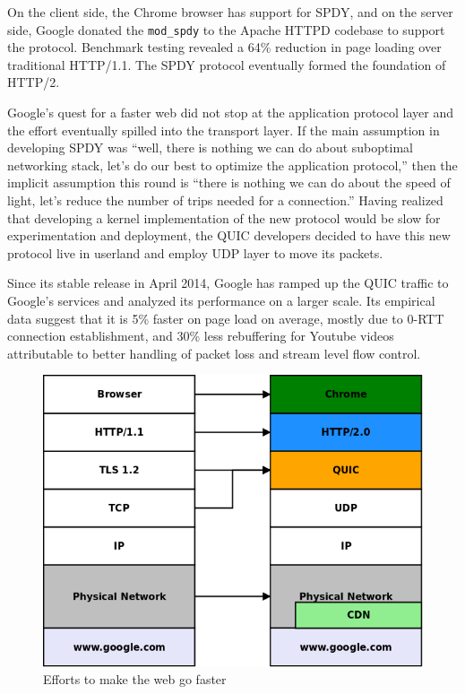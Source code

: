 \documentclass{sig-alternate-05-2015}
\begin{document}
On the client side, the Chrome browser has support for SPDY, and on the server side, Google donated the \texttt{mod\_spdy} to the Apache HTTPD codebase to support the protocol. Benchmark testing revealed a 64\% reduction in page loading over traditional HTTP/1.1. The SPDY protocol eventually formed the foundation of HTTP/2.

Google's quest for a faster web did not stop at the application protocol layer and the effort eventually spilled into the transport layer. If the main assumption in developing SPDY was ``well, there is nothing we can do about suboptimal networking stack, let's do our best to optimize the application protocol,'' then the implicit assumption this round is ``there is nothing we can do about the speed of light, let's reduce the number of trips needed for a connection.''\cite{quic:announcement} Having realized that developing a kernel implementation of the new protocol would be slow for experimentation and deployment, the QUIC developers decided to have this new protocol live in userland and employ UDP layer to move its packets. 

Since its stable release in April 2014, Google has ramped up the QUIC traffic to Google's services and analyzed its performance on a larger scale. Its empirical data suggest that it is 5\% faster on page load on average, mostly due to 0-RTT connection establishment, and 30\% less rebuffering for Youtube videos attributable to better handling of packet loss and stream level flow control.\cite{quic:presentation}

\begin{figure}[bh]
\centering
\includegraphics[scale=0.27]{web.png}
\caption{Efforts to make the web go faster}
\label{fig:webstack}
\end{figure}
\end{document}

